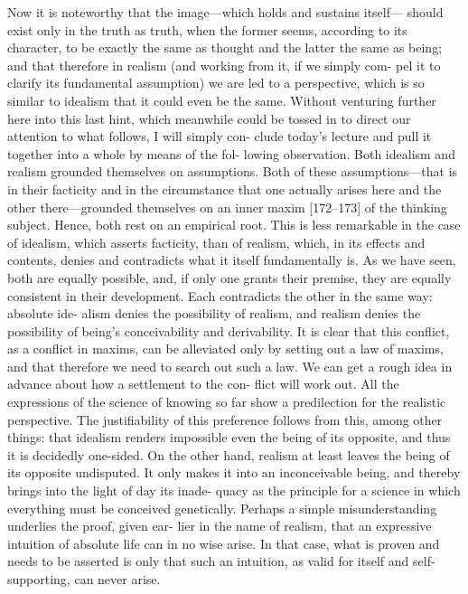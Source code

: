 Now it is noteworthy that the image—which holds and sustains itself—
should exist only in the truth as truth, when the former seems, according to
its character, to be exactly the same as thought and the latter the same as
being; and that therefore in realism (and working from it, if we simply com-
pel it to clarify its fundamental assumption) we are led to a perspective,
 which is so similar to idealism that it could even be the same.
Without venturing further here into this last hint, which meanwhile
could be tossed in to direct our attention to what follows, I will simply con-
clude today’s lecture and pull it together into a whole by means of the fol-
lowing observation.
 Both idealism and realism grounded themselves on
assumptions.
 Both of these assumptions—that is in their facticity and in the
circumstance that one actually arises here and the other there—grounded
themselves on an inner maxim [172–173] of the thinking subject.
 Hence, both
rest on an empirical root.
 This is less remarkable in the case of idealism, which
asserts facticity, than of realism, which, in its effects and contents, denies and
contradicts what it itself fundamentally is.
 As we have seen, both are equally
possible, and, if only one grants their premise, they are equally consistent in
their development.
 Each contradicts the other in the same way: absolute ide-
alism denies the possibility of realism, and realism denies the possibility of
being’s conceivability and derivability.
 It is clear that this conflict, as a conflict
in maxims, can be alleviated only by setting out a law of maxims, and that
therefore we need to search out such a law.
We can get a rough idea in advance about how a settlement to the con-
flict will work out.
 All the expressions of the science of knowing so far show
a predilection for the realistic perspective.
 The justifiability of this preference
follows from this, among other things: that idealism renders impossible even
the being of its opposite, and thus it is decidedly one-sided.
 On the other hand,
realism at least leaves the being of its opposite undisputed.
 It only makes it
into an inconceivable being, and thereby brings into the light of day its inade-
quacy as the principle for a science in which everything must be conceived
genetically.
 Perhaps a simple misunderstanding underlies the proof, given ear-
lier in the name of realism, that an expressive intuition of absolute life can in
no wise arise.
 In that case, what is proven and needs to be asserted is only that
such an intuition, as valid for itself and self-supporting, can never arise.
